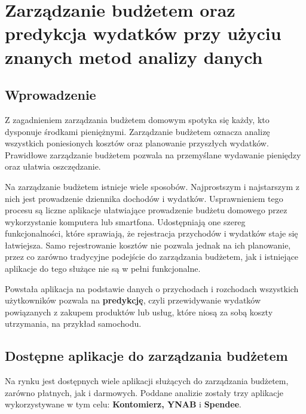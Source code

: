 \chapter{Zarządzanie budżetem oraz predykcja wydatków przy użyciu znanych metod analizy danych}
\section{Wprowadzenie}
Z zagadnieniem zarządzania budżetem domowym spotyka się każdy, kto dysponuje środkami pieniężnymi. Zarządzanie budżetem oznacza analizę wszystkich poniesionych kosztów oraz planowanie przyszłych wydatków. Prawidłowe zarządzanie budżetem pozwala na przemyślane wydawanie pieniędzy oraz ułatwia oszczędzanie.

Na zarządzanie budżetem istnieje wiele sposobów. Najprostszym i najstarszym z nich jest prowadzenie dziennika dochodów i wydatków. Usprawnieniem tego procesu są liczne aplikacje ułatwiające prowadzenie budżetu domowego przez wykorzystanie komputera lub smartfona. Udostępniają one szereg funkcjonalności, które sprawiają, że rejestracja przychodów i wydatków staje się łatwiejsza. Samo rejestrowanie kosztów nie pozwala jednak na ich planowanie, przez co zarówno tradycyjne podejście do zarządzania budżetem, jak i istniejące aplikacje do tego służące nie są w pełni funkcjonalne.
 
Powstała aplikacja na podstawie danych o przychodach i rozchodach wszystkich użytkowników pozwala na \textbf{predykcję}, czyli przewidywanie wydatków powiązanych z zakupem produktów lub usług, które niosą za sobą koszty utrzymania, na przykład samochodu.
\section{Dostępne aplikacje do zarządzania budżetem}
Na rynku jest dostępnych wiele aplikacji służących do zarządzania budżetem, zarówno płatnych, jak i darmowych. Poddane analizie zostały trzy aplikacje wykorzystywane w tym celu: \textbf{Kontomierz, YNAB} i \textbf{Spendee}.

